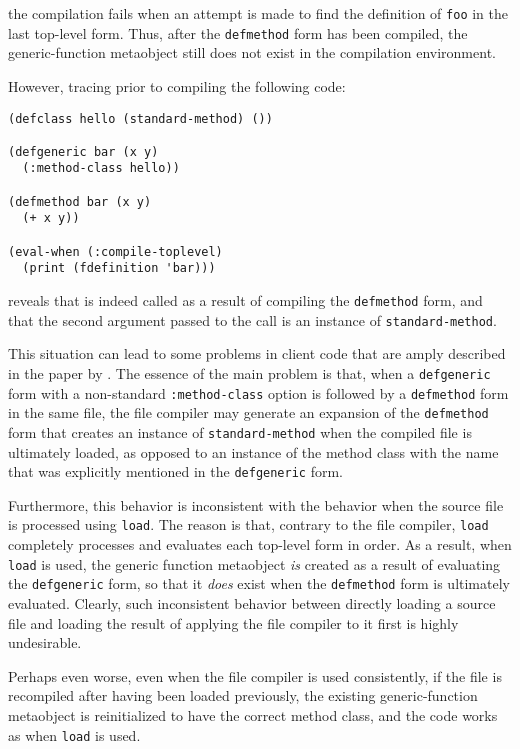 \noindent
the compilation fails when an attempt is made to find the definition
of \texttt{foo} in the last top-level form.  Thus, after the
\texttt{defmethod} form has been compiled, the generic-function
metaobject still does not exist in the compilation environment.

However, tracing \mml{} prior to compiling the following code:

\begin{verbatim}
(defclass hello (standard-method) ())

(defgeneric bar (x y)
  (:method-class hello))

(defmethod bar (x y)
  (+ x y))

(eval-when (:compile-toplevel)
  (print (fdefinition 'bar)))
\end{verbatim}

\noindent
reveals that \mml{} is indeed called as a result of compiling the
\texttt{defmethod} form, and that the second argument passed to the
call is an instance of \texttt{standard-method}.

This situation can lead to some problems in client code that are amply
described in the paper by \cnh{}.  The essence of the
main problem is that, when a \texttt{defgeneric} form with a
non-standard \texttt{:method-class} option is followed by a
\texttt{defmethod} form in the same file, the file compiler may
generate an expansion of the \texttt{defmethod} form that creates an
instance of \texttt{standard-method} when the compiled file is
ultimately loaded, as opposed to an instance of the method class with
the name that was explicitly mentioned in the \texttt{defgeneric}
form.

Furthermore, this behavior is inconsistent with the behavior when the
source file is processed using \texttt{load}.  The reason is that,
contrary to the file compiler, \texttt{load} completely processes and
evaluates each top-level form in order.  As a result, when
\texttt{load} is used, the generic function metaobject \emph{is}
created as a result of evaluating the \texttt{defgeneric} form, so
that it \emph{does} exist when the \texttt{defmethod} form is
ultimately evaluated.  Clearly, such inconsistent behavior between
directly loading a source file and loading the result of applying the
file compiler to it first is highly undesirable.

Perhaps even worse, even when the file compiler is used consistently,
if the file is recompiled after having been loaded previously, the
existing generic-function metaobject is reinitialized to have the
correct method class, and the code works as when \texttt{load} is
used.

